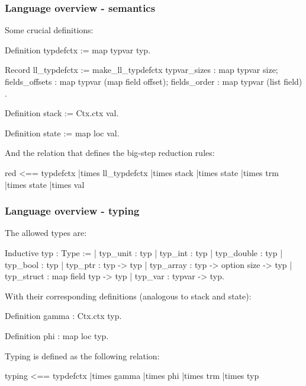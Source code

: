 \begin{frame}[fragile]
\frametitle{Language overview - semantics}

Some crucial definitions:

\begin{coqs}
  Definition typdefctx := map typvar typ.

  Record ll_typdefctx := make_ll_typdefctx {
    typvar_sizes				: map typvar size;
    fields_offsets	: map typvar (map field offset);
    fields_order				: map typvar (list field) }.
  
  Definition stack := Ctx.ctx val.

  Definition state := map loc val.
\end{coqs}

\bigskip

And the relation that defines the big-step reduction rules:

\begin{coqs}
  red 	<==		typdefctx |times 	ll_typdefctx |times 	stack |times 	state |times 	trm |times	state |times	val
\end{coqs}

\end{frame}


\begin{frame}[fragile]
\frametitle{Language overview - typing}

The allowed types are:

\begin{coqs}
  Inductive typ : Type :=
    | typ_unit : typ
    | typ_int : typ
    | typ_double : typ
    | typ_bool : typ
    | typ_ptr : typ -> typ
    | typ_array : typ -> option size -> typ
    | typ_struct : map field typ -> typ
    | typ_var : typvar -> typ.
\end{coqs}

\bigskip

With their corresponding definitions (analogous to stack and state):

\begin{coqs}
  Definition gamma : Ctx.ctx typ.

  Definition phi : map loc typ.
\end{coqs}

\bigskip

Typing is defined as the following relation:

\begin{coqs}
  typing		<==		typdefctx |times 	gamma |times 	phi |times 	trm |times	typ
\end{coqs}

\end{frame}


